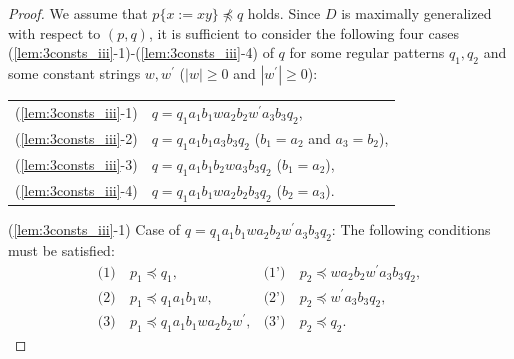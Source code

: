 \begin{proof}
We assume that $p \{ x := xy \} \not\preceq q$ holds.
Since $D$ is maximally generalized {\color{red}with respect to} $(p,q)$, it is sufficient to consider the following four cases (\ref{lem:3consts_iii}-1)-(\ref{lem:3consts_iii}-4) of $q$ for some regular patterns $q_{1},q_{2}$ and some constant strings $w,w^{\prime}$ ($|w|\geq 0$ and $|w^{\prime}|\geq 0$):

\smallskip

\noindent
\begin{tabular}{ll}
(\ref{lem:3consts_iii}-1) & $q=q_{1}a_{1}b_{1}wa_{2}b_{2}w^{\prime}a_{3}b_{3}q_{2}$,\\
(\ref{lem:3consts_iii}-2) & $q=q_{1}a_{1}b_{1}a_{3}b_{3}q_{2}$ ($b_{1}=a_{2}$ and $a_{3}=b_{2}$),\\
(\ref{lem:3consts_iii}-3) & $q=q_{1}a_{1}b_{1}b_{2}wa_{3}b_{3}q_{2}$ ($b_{1}=a_{2}$),\\
(\ref{lem:3consts_iii}-4) & $q=q_{1}a_{1}b_{1}wa_{2}b_{2}b_{3}q_{2}$ ($b_{2}=a_{3}$).
\end{tabular}

\smallskip

\noindent
(\ref{lem:3consts_iii}-1) Case of $q=q_{1}a_{1}b_{1}wa_{2}b_{2}w^{\prime}a_{3}b_{3}q_{2}$:
The following conditions must be satisfied:
\begin{align*}
\textrm{(1)}~& p_{1} \preceq q_{1}, & \textrm{(1')}~& p_{2} \preceq wa_{2}b_{2}w^{\prime}a_{3}b_{3}q_{2}, \\
\textrm{(2)}~& p_{1} \preceq q_{1}a_{1}b_{1}w, & \textrm{(2')}~& p_{2} \preceq w^{\prime}a_{3}b_{3}q_{2}, \\
\textrm{(3)}~& p_{1} \preceq q_{1}a_{1}b_{1}wa_{2}b_{2}w^{\prime}, & \textrm{(3')}~& p_{2} \preceq q_{2}.
\end{align*}


\end{proof}
